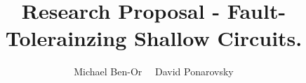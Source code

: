 \documentclass[manuscript,screen,review]{acmart}
\begin{document}

\title{ Research Proposal - Fault-Tolerainzing Shallow Circuits. }
\author{Michael Ben-Or \ \ David Ponarovsky}
\maketitle

\newcommand*{\Mbas}{\mathcal{X}^\prime}
\newcommand*{\bas}{\mathcal{X}}
\newcommand*{\sMbas}{\Mbas}
\newcommand*{\QQ}{C_{X}/C_{Z}^\perp }
\newcommand*{\trig}{ Triorthogonal }
\newcommand*{\Hyp}{ Hyperproduct }
\newcommand*{\Cin}{ C_{\text{initial}} }
\newcommand*{\Ctan}{ C_{\text{Tan}} }



\newcommand*{\QACze}{\mathbf{QAC}_{0}}
\newcommand*{\QNCzef}{\mathbf{QNC}_{0,f}}
\newcommand*{\QNCze}{\mathbf{QNC}_{0}}
\newcommand*{\QNCon}{\mathbf{QNC}_{1}}
\newcommand*{\NCon}{\mathbf{NC}_{1}}
\newcommand*{\noiseQNCon}{noisy-$\QNCon$}
\newcommand*{\QNC}{\mathbf{QNC}}
\newcommand*{\QNCG}{\mathbf{QNC_G}}
\newcommand*{\NC}{\mathbf{NC}}
\newcommand*{\QNCiG}{\mathbf{QNC_{G,i}}}


\newcommand*{\CDO} {CDFT} 
\end{document}
